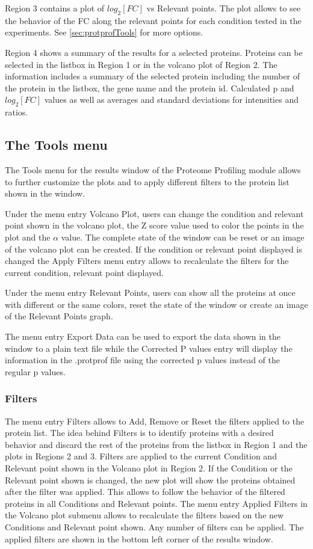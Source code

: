 Region \num{3} contains a plot of $log_2[FC]$ vs Relevant points. The plot allows to see the behavior of the FC along the relevant points for each condition tested in the experiments. See \autoref{sec:protprofTools} for more options.

Region \num{4} shows a summary of the results for a selected proteins. Proteins can be selected in the listbox in Region \num{1} or in the volcano plot of Region \num{2}. The information includes a summary of the selected protein including the number of the protein in the listbox, the gene name and the protein id. Calculated p and $log_2[FC]$ values as well as averages and standard deviations for intensities and ratios.

\subsection{The Tools menu}
\label{sec:protprofTools}

The Tools menu for the results window of the Proteome Profiling module allows to further customize the plots and to apply different filters to the protein list shown in the window.

Under the menu entry Volcano Plot, users can change the condition and relevant point shown in the volcano plot, the Z score value used to color the points in the plot and the $\alpha$ value. The complete state of the window can be reset or an image of the volcano plot can be created. If the condition or relevant point displayed is changed the Apply Filters menu entry allows to recalculate the filters for the current condition, relevant point displayed.

Under the menu entry Relevant Points, users can show all the proteins at once with different or the same colors, reset the state of the window or create an image of the Relevant Points graph.

The menu entry Export Data can be used to export the data shown in the window to a plain text file while the Corrected P values entry will display the information in the .protprof file using the corrected p values instead of the regular p values.

\subsubsection{Filters}

The menu entry Filters allows to Add, Remove or Reset the filters applied to the protein list. The idea behind Filters is to identify proteins with a desired behavior and discard the rest of the proteins from the listbox in Region \num{1} and the plots in Regions \num{2} and \num{3}. Filters are applied to the current Condition and Relevant point shown in the Volcano plot in Region \num{2}. If the Condition or the Relevant point shown is changed, the new plot will show the proteins obtained after the filter was applied. This allows to follow the behavior of the filtered proteins in all Conditions and Relevant points. The menu entry Applied Filters in the Volcano plot submenu allows to recalculate the filters based on the new Conditions and Relevant point shown. Any number of filters can be applied. The applied filters are shown in the bottom left corner of the results window. 

